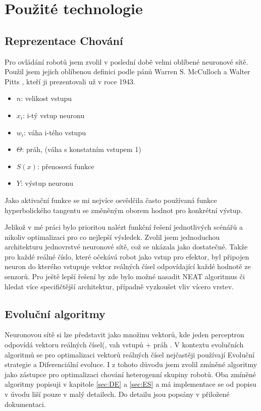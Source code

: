 \section{Použité technologie}
\subsection{Reprezentace Chování}
Pro ovládání robotů jsem zvolil v poslední době velmi oblíbené neuronové sítě. Použil jsem jejich oblíbenou definici podle pánů Warren S. McCulloch a  Walter Pitts \citep{neuron}, kteří ji prezentovali už v roce 1943. 
\begin{itemize}[]
	\item $n$: velikost vstupu
	\item $x_i$:  i-tý vstup neuronu
	\item $w_i$:  váha i-tého vstupu
	\item $\Theta$: práh, (váha s konstatním vstupem 1)
	\item $S(x)$: přenosová funkce
	\item $Y$: výstup neuronu 
\end{itemize}

\begin{center}
	\large{}
\end{center}
Jako aktivační funkce se mi nejvíce osvědčila často používaná funkce hyperbolického tangentu se změněným oborem hodnot pro konkrétní výstup. \par
{}Jelikož v mé práci bylo prioritou nalézt funkční řešení jednotlivých scénářů a nikoliv optimalizaci pro co nejlepší výsledek.  Zvolil jsem jednoduchou architekturu jednovrstvé neuronové sítě, což se ukázala jako dostatečné. Takže pro každé reálné číslo, které očekává robot jako vstup pro efektor, byl připojen neuron do kterého vstupuje vektor reálných čísel odpovídající každé hodnotě ze senzorů.  Pro ještě lepší řešení by zde bylo možné nasadit NEAT algoritmus či hledat více specifičtější architektur, případně vyzkoušet vliv vícero vrstev. 
\subsection{Evoluční algoritmy}
Neuronovou sítě si lze představit jako množinu vektorů, kde jeden perceptron odpovídá vektoru reálných čísel(, vah vstupů + práh . V kontextu evolučních algoritmů se pro optimalizaci vektorů reálných čísel nejčastěji používají Evoluční strategie a Diferenciální evoluce. I z tohoto důvodu jsem zvolil zmíněné algoritmy jako zástupce pro optimalizaci chování heterogenní skupiny robotů. Oba zmíněné algoritmy popisuji v kapitole \ref{sec:DE} a \ref{sec:ES} a má implementace se od popisu v úvodu liší pouze v malý detailech. Do detailu jsou popsány v přiložené dokumentaci. 
\par
